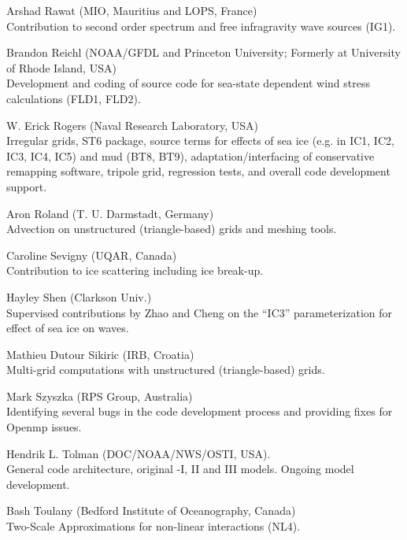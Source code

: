 \begin{list}{\ldots}{ }
\item [Arshad Rawat] (MIO, Mauritius and LOPS, France) \\
  Contribution to second order spectrum and free infragravity wave sources (IG1).    

\item [Brandon Reichl] (NOAA/GFDL and Princeton University; Formerly at University of Rhode Island, USA) \\
  Development and coding of source code for sea-state dependent wind stress calculations (FLD1, FLD2).

\item [W. Erick Rogers]  (Naval Research Laboratory, USA)\\ 
  Irregular grids, ST6 package, source terms for effects of sea ice (e.g. in IC1, IC2, IC3, IC4, IC5) and mud (BT8, BT9), adaptation/interfacing of conservative remapping software, tripole grid, regression tests, and overall code development support.

\item [Aron Roland] (T. U. Darmstadt, Germany) \\
  Advection on unstructured (triangle-based) grids and meshing tools.

\item [Caroline Sevigny] (UQAR, Canada) \\
  Contribution to ice scattering including ice break-up.

\item [Hayley Shen] (Clarkson Univ.) \\
  Supervised contributions by Zhao and Cheng on the ``IC3'' parameterization for effect of sea ice on waves.

\item [Mathieu Dutour Sikiric] (IRB, Croatia) \\
  Multi-grid computations with unstructured (triangle-based) grids.

\item [Mark Szyszka] (RPS Group, Australia) \\
  Identifying several bugs in the code development process and providing fixes for Openmp issues.

\item [Hendrik L. Tolman] (DOC/NOAA/NWS/OSTI, USA). \\
  General code architecture, original \wt-I, II and III models. Ongoing model
  development.

\item [Bash Toulany] (Bedford Institute of Oceanography, Canada)\\
 Two-Scale Approximations for non-linear interactions (NL4).


\end{list}
